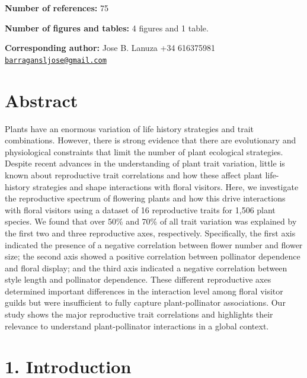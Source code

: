 \documentclass[
  12pt,
  a4paper,
]{article}
\begin{document}
\textbf{Number of references:} 75

\textbf{Number of figures and tables:} 4 figures and 1 table.

\textbf{Corresponding author:} Jose B. Lanuza \textbar{} +34 616375981\textbar{} \href{mailto:barragansljose@gmail.com}{\nolinkurl{barragansljose@gmail.com}}

\newpage

\hypertarget{abstract}{%
\section{Abstract}\label{abstract}}

Plants have an enormous variation of life history strategies and trait combinations. However, there is strong evidence that there are evolutionary and physiological constraints that limit the number of plant ecological strategies. Despite recent advances in the understanding of plant trait variation, little is known about reproductive trait correlations and how these affect plant life-history strategies and shape interactions with floral visitors. Here, we investigate the reproductive spectrum of flowering plants and how this drive interactions with floral visitors using a dataset of 16 reproductive traits for 1,506 plant species. We found that over 50\% and 70\% of all trait variation was explained by the first two and three reproductive axes, respectively. Specifically, the first axis indicated the presence of a negative correlation between flower number and flower size; the second axis showed a positive correlation between pollinator dependence and floral display; and the third axis indicated a negative correlation between style length and pollinator dependence. These different reproductive axes determined important differences in the interaction level among floral visitor guilds but were insufficient to fully capture plant-pollinator associations. Our study shows the major reproductive trait correlations and highlights their relevance to understand plant-pollinator interactions in a global context.

\newpage

\doublespacing
\vspace{5mm}
\normalsize

\hypertarget{introduction}{%
\section{1. Introduction}\label{introduction}}
\end{document}
